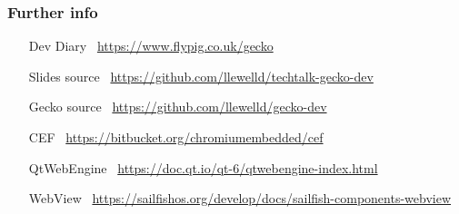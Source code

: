 \documentclass[
	notes=none,
	aspectratio=169
]{beamer}
\begin{document}
\begin{frame}[fragile]
\frametitle{Further info}
\setlength{\leftmargini}{7.5em}
\vspace{1.0cm}

\begin{itemize}
\setlength{\parskip}{1.0em}
\item[Dev Diary \,] \url{https://www.flypig.co.uk/gecko}
\item[Slides source \,] \url{https://github.com/llewelld/techtalk-gecko-dev}
\item[Gecko source \,] \url{https://github.com/llewelld/gecko-dev}
\item[CEF \,] \url{https://bitbucket.org/chromiumembedded/cef}
\item[QtWebEngine \,] \url{https://doc.qt.io/qt-6/qtwebengine-index.html}
\item[WebView \,] \url{https://sailfishos.org/develop/docs/sailfish-components-webview}
\end{itemize}

\end{frame}
\note{
\fontsize{7pt}{8pt}{}

}

\end{document}
